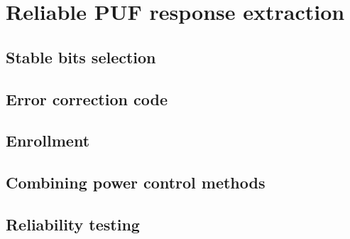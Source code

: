 \chapter{Reliable PUF response extraction}\label{sec:response_extraction} %


\section{Stable bits selection}


\section{Error correction code}\label{sec:ecc}

\section{Enrollment}

\section{Combining power control methods}

\section{Reliability testing}

